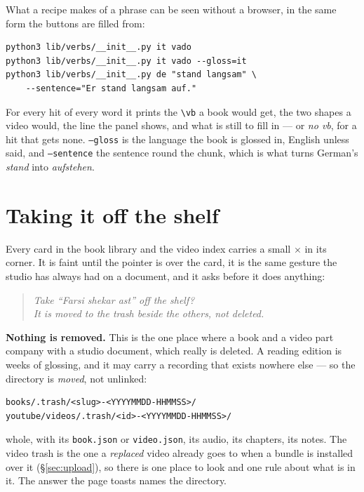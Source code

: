 \documentclass[11pt,oneside]{report}
\newcommand{\gw}[1]{\foreignlanguage{ngerman}{\emph{#1}}}
\newcommand{\file}[1]{\texttt{#1}}
\newcommand{\menu}[1]{\textsf{#1}}
\begin{document}
\noindent What a recipe makes of a phrase can be seen without a browser, in
the same form the buttons are filled from:

\begin{lstlisting}
python3 lib/verbs/__init__.py it vado
python3 lib/verbs/__init__.py it vado --gloss=it
python3 lib/verbs/__init__.py de "stand langsam" \
    --sentence="Er stand langsam auf."
\end{lstlisting}

\noindent For every hit of every word it prints the \texttt{\textbackslash vb}
a book would get, the two shapes a video would, the line the panel shows, and
what is still to fill in --- or \emph{no vb}, for a hit that gets none.
\texttt{--gloss} is the language the book is glossed in, English unless said,
and \texttt{--sentence} the sentence round the chunk, which is what turns
German's \gw{stand} into \gw{aufstehen}.

\section{Taking it off the shelf}
\label{sec:delete}

Every card in the book library and the video index carries a small
\menu{$\times$} in its corner. It is faint until the pointer is over the card,
it is the same gesture the studio has always had on a document, and it asks
before it does anything:

\begin{quote}
\emph{Take ``Farsi shekar ast'' off the shelf?}\\
\emph{It is moved to the trash beside the others, not deleted.}
\end{quote}

\textbf{Nothing is removed.} This is the one place where a book and a video
part company with a studio document, which really is deleted. A reading
edition is weeks of glossing, and it may carry a recording that exists nowhere
else --- so the directory is \emph{moved}, not unlinked:

\begin{lstlisting}
books/.trash/<slug>-<YYYYMMDD-HHMMSS>/
youtube/videos/.trash/<id>-<YYYYMMDD-HHMMSS>/
\end{lstlisting}

\noindent whole, with its \file{book.json} or \file{video.json}, its audio,
its chapters, its notes. The video trash is the one a \emph{replaced} video
already goes to when a bundle is installed over it (\S\ref{sec:upload}), so
there is one place to look and one rule about what is in it. The answer the
page toasts names the directory.
\end{document}
